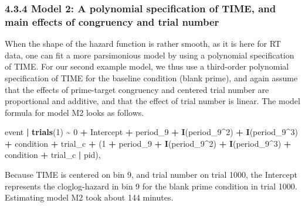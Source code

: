 \documentclass[
  man,floatsintext]{apa6}
\newenvironment{Shaded}{\begin{snugshade}}{\end{snugshade}}
\newcommand{\DecValTok}[1]{\textcolor[rgb]{0.00,0.00,0.81}{#1}}
\newcommand{\FunctionTok}[1]{\textcolor[rgb]{0.13,0.29,0.53}{\textbf{#1}}}
\newcommand{\NormalTok}[1]{#1}
\newcommand{\SpecialCharTok}[1]{\textcolor[rgb]{0.81,0.36,0.00}{\textbf{#1}}}
\begin{document}
\subsubsection{4.3.4 Model 2: A polynomial specification of TIME, and main effects of congruency and trial number}\label{model-2-a-polynomial-specification-of-time-and-main-effects-of-congruency-and-trial-number}

When the shape of the hazard function is rather smooth, as it is here for RT data, one can fit a more parsimonious model by using a polynomial specification of TIME. For our second example model, we thus use a third-order polynomial specification of TIME for the baseline condition (blank prime), and again assume that the effects of prime-target congruency and centered trial number are proportional and additive, and that the effect of trial number is linear. The model formula for model M2 looks as follows.

\scriptsize

\begin{Shaded}
\begin{Highlighting}[]
\NormalTok{event }\SpecialCharTok{|} \FunctionTok{trials}\NormalTok{(}\DecValTok{1}\NormalTok{) }\SpecialCharTok{\textasciitilde{}} \DecValTok{0} \SpecialCharTok{+}\NormalTok{ Intercept }\SpecialCharTok{+}\NormalTok{ period\_9 }\SpecialCharTok{+} \FunctionTok{I}\NormalTok{(period\_9}\SpecialCharTok{\^{}}\DecValTok{2}\NormalTok{) }\SpecialCharTok{+} \FunctionTok{I}\NormalTok{(period\_9}\SpecialCharTok{\^{}}\DecValTok{3}\NormalTok{) }\SpecialCharTok{+}
\NormalTok{                           condition }\SpecialCharTok{+}\NormalTok{ trial\_c }\SpecialCharTok{+}
\NormalTok{                           (}\DecValTok{1} \SpecialCharTok{+}\NormalTok{ period\_9 }\SpecialCharTok{+} \FunctionTok{I}\NormalTok{(period\_9}\SpecialCharTok{\^{}}\DecValTok{2}\NormalTok{) }\SpecialCharTok{+} \FunctionTok{I}\NormalTok{(period\_9}\SpecialCharTok{\^{}}\DecValTok{3}\NormalTok{) }\SpecialCharTok{+}
\NormalTok{                           condition }\SpecialCharTok{+}\NormalTok{ trial\_c }\SpecialCharTok{|}\NormalTok{ pid),}
\end{Highlighting}
\end{Shaded}

\normalsize

Because TIME is centered on bin 9, and trial number on trial 1000, the Intercept represents the cloglog-hazard in bin 9 for the blank prime condition in trial 1000. Estimating model M2 took about 144 minutes.
\end{document}
